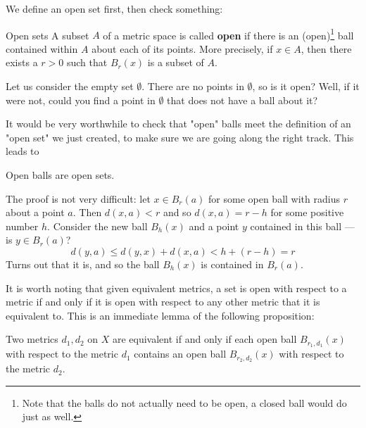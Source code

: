 We define an open set first, then check something:
\begin{bdefin}{Open sets}{}
A subset $A$ of a metric space is called \textbf{open} if there is an (open)\footnote{Note that the balls do not actually need to be open, a closed ball would do just as well.} ball contained within $A$ about each of its points. More precisely, if $x \in A$, then there exists a $r>0$ such that $B_{r}(x)$ is a subset of $A$.
\end{bdefin}

Let us consider the empty set $\emptyset$. There are no points in $\emptyset$, so is it open? Well, if it were not, could you find a point in $\emptyset$ that does not have a ball about it? 

It would be very worthwhile to check that "open" balls meet the definition of an "open set" we just created, to make sure we are going along the right track. This leads to
\begin{bprop}{}{}
Open balls are open sets.
\end{bprop}
\begin{bproof}{}{}
The proof is not very difficult: let $x\in B_{r}(a)$ for some open ball with radius $r$ about a point $a$. Then $d(x,a)<r$ and so $d(x,a) = r - h$ for some positive number $h$. Consider the new ball $B_{h}(x)$ and a point $y$ contained in this ball — is $y \in B_{r}(a)$?
\[ d(y,a) \leq d(y,x) + d(x,a) < h + (r-h) = r \]
Turns out that it is, and so the ball $B_{h}(x)$ is contained in $B_{r}(a)$.
\eop
\end{bproof}


It is worth noting that given equivalent metrics, a set is open with respect to a metric if and only if it is open with respect to any other metric that it is equivalent to. This is an immediate lemma of the following proposition:

\begin{bprop}{}{}
Two metrics $d_{1}, d_{2}$ on $X$ are equivalent if and only if each open ball $B_{r_{1},d_{1}}(x)$ with respect to the metric $d_{1}$ contains an open ball $B_{r_{2},d_{2}}(x)$ with respect to the metric $d_{2}$.
\end{bprop}

